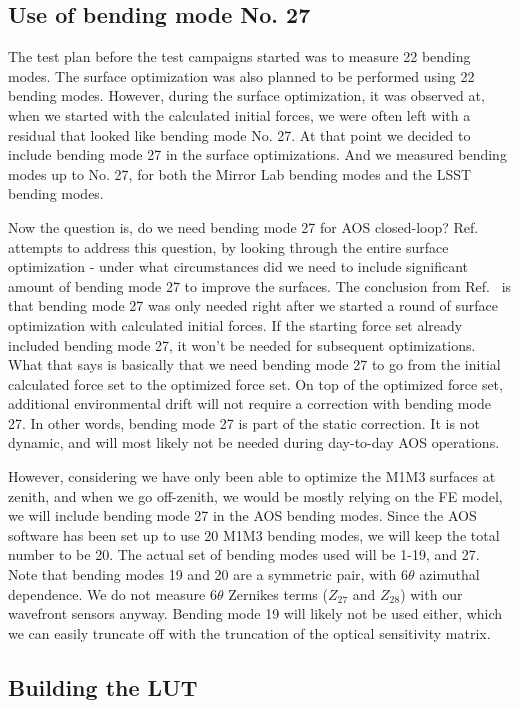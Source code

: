 \documentclass [twoside,openbib,12pt]{article}
\begin{document}
\subsection{Use of bending mode No. 27}

The test plan before the test campaigns started was to measure 22
bending modes. The surface optimization was also planned to be
performed using 22 bending modes.
However, during the surface optimization, it was observed at, when we
started with the calculated initial forces, we were often left with a
residual that looked like bending mode No. 27.
At that point we decided to include bending mode 27 in the surface
optimizations. And we measured bending modes up to No. 27, for both
the Mirror Lab bending modes and the LSST bending modes.

Now the question is,  
do we need bending mode 27 for AOS closed-loop?
Ref.~\cite{m1m3bm27} attempts to address this question, by looking through
the entire surface optimization - under what circumstances did we need
to include significant amount of bending mode 27 to improve the
surfaces.
The conclusion from Ref.~\cite{m1m3bm27} is that bending mode 27 was only
needed right after we started a round of surface optimization with
calculated initial forces. If the
starting force set already included bending mode 27, it won't be
needed for subsequent optimizations.
What that says is basically that we need bending mode 27 to go from
the initial calculated force set to the optimized force set. On top of
the optimized force set, additional environmental drift will not
require a correction with bending mode 27. In other words, bending
mode 27 is part of the static correction. It is not dynamic, and will
most likely not be needed during day-to-day AOS operations.

However, considering we have only been able to optimize the M1M3
surfaces at zenith, and when we go off-zenith, we would be mostly relying
on the FE model, we will include bending mode 27 in the AOS bending
modes.
Since the AOS software has been set up to use 20 M1M3 bending modes,
we will keep the total number to be 20. The actual set of bending
modes used will be 1-19, and 27.
Note that bending modes 19 and 20 are a symmetric pair, with $6\theta$
azimuthal dependence.
We do not measure $6\theta$ Zernikes terms ($Z_{27}$ and $Z_{28}$) with
our wavefront sensors anyway.
Bending mode 19 will likely not be used either, which we can easily
truncate off with the truncation of the optical sensitivity matrix.

\subsection{Building the LUT}
\label{sec:LUT}
\end{document}
